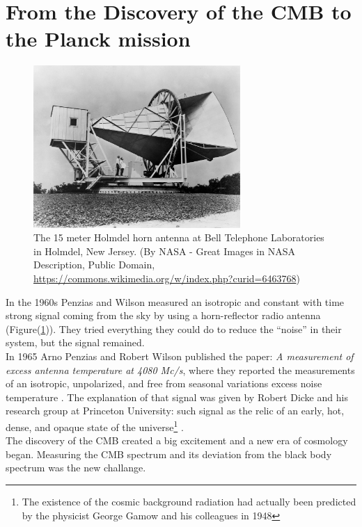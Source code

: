 \documentclass{article}
\begin{document}
\section{From the Discovery of the CMB to the Planck mission}
%
%
%
\begin{figure}
\begin{center}
\includegraphics[width=0.7\textwidth]{Horn_Antenna.jpeg}
\caption{The 15 meter Holmdel horn antenna at Bell Telephone Laboratories in Holmdel, New Jersey.
(By NASA - Great Images in NASA Description, Public Domain, \url{https://commons.wikimedia.org/w/index.php?curid=6463768})}
\label{antenna}
\end{center}
\end{figure}
%
%
%
In the 1960s Penzias and Wilson measured an isotropic and constant with time strong signal coming from the sky by using a horn-reflector radio antenna (Figure(\ref{antenna})). 
They tried everything they could do to reduce the “noise” in their system, but the signal remained.\\
In 1965 Arno Penzias and Robert Wilson published the paper: \emph{A measurement of excess antenna temperature at
4080 Mc/s}, where they reported the measurements of an isotropic, unpolarized, and free from seasonal variations excess noise temperature
\citep{penziasMeasurementExcessAntenna1965}.
The explanation of that signal was given by Robert Dicke and his research group at Princeton University: such signal as the relic of an early, hot, dense, and opaque state of the universe\footnote{The existence of the cosmic background radiation had actually been predicted by the physicist George Gamow and his colleagues in 1948} \citep{bucherPhysicsCosmicMicrowave2015}
. \\
The discovery of the CMB created a big excitement and a new era of cosmology began.
Measuring the CMB spectrum and its deviation from the black body spectrum was the new challange.
\end{document}
